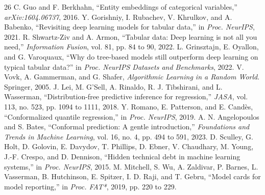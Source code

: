 \documentclass[journal,10pt]{IEEEtran}
\begin{document}
\begin{thebibliography}{26}
 C. Guo and F. Berkhahn, ``Entity embeddings of categorical variables,'' \emph{arXiv:1604.06737}, 2016.
 Y. Gorishniy, I. Rubachev, V. Khrulkov, and A. Babenko, ``Revisiting deep learning models for tabular data,'' in \emph{Proc. NeurIPS}, 2021.
 R. Shwartz-Ziv and A. Armon, ``Tabular data: Deep learning is not all you need,'' \emph{Information Fusion}, vol. 81, pp. 84 to 90, 2022.
 L. Grinsztajn, E. Oyallon, and G. Varoquaux, ``Why do tree-based models still outperform deep learning on typical tabular data?'' in \emph{Proc. NeurIPS Datasets and Benchmarks}, 2022.
 V. Vovk, A. Gammerman, and G. Shafer, \emph{Algorithmic Learning in a Random World}. Springer, 2005.
 J. Lei, M. G'Sell, A. Rinaldo, R. J. Tibshirani, and L. Wasserman, ``Distribution-free predictive inference for regression,'' \emph{JASA}, vol. 113, no. 523, pp. 1094 to 1111, 2018.
 Y. Romano, E. Patterson, and E. Cand\`es, ``Conformalized quantile regression,'' in \emph{Proc. NeurIPS}, 2019.
 A. N. Angelopoulos and S. Bates, ``Conformal prediction: A gentle introduction,'' \emph{Foundations and Trends in Machine Learning}, vol. 16, no. 4, pp. 494 to 591, 2023.
 D. Sculley, G. Holt, D. Golovin, E. Davydov, T. Phillips, D. Ebner, V. Chaudhary, M. Young, J.-F. Crespo, and D. Dennison, ``Hidden technical debt in machine learning systems,'' in \emph{Proc. NeurIPS}, 2015.
 M. Mitchell, S. Wu, A. Zaldivar, P. Barnes, L. Vasserman, B. Hutchinson, E. Spitzer, I. D. Raji, and T. Gebru, ``Model cards for model reporting,'' in \emph{Proc. FAT*}, 2019, pp. 220 to 229.
\end{thebibliography}
\end{document}
